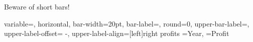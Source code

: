 \documentclass[12pt]{article}
\begin{document}
Beware of short bars! 

\DTLbarchart
{
 variable=\theProfit,
 horizontal,
 bar-width=20pt, 
 bar-label=\theYear,
 round=0,
 upper-bar-label=\DTLbarvalue,
 upper-label-offset={ -\DTLbarlabeloffset },
 upper-label-align={[left]right}
}
{profits}%
 {%
 \theYear=Year,
 \theProfit=Profit
} 
\end{document}
